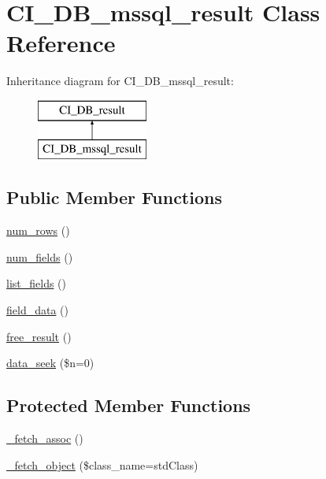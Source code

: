 \hypertarget{class_c_i___d_b__mssql__result}{}\section{C\+I\+\_\+\+D\+B\+\_\+mssql\+\_\+result Class Reference}
\label{class_c_i___d_b__mssql__result}
Inheritance diagram for C\+I\+\_\+\+D\+B\+\_\+mssql\+\_\+result\+:\begin{figure}[H]
\begin{center}
\leavevmode
\includegraphics[height=2.000000cm]{class_c_i___d_b__mssql__result}
\end{center}
\end{figure}
\subsection*{Public Member Functions}
\begin{DoxyCompactItemize}
\item 
\mbox{\hyperlink{class_c_i___d_b__mssql__result_a3ee369815a7eaba62882d23828b50169}{num\+\_\+rows}} ()
\item 
\mbox{\hyperlink{class_c_i___d_b__mssql__result_a419497c7541ba9324a4e7bcd1d0ececb}{num\+\_\+fields}} ()
\item 
\mbox{\hyperlink{class_c_i___d_b__mssql__result_a58e07860cb71e9ea572921ba205eb5ed}{list\+\_\+fields}} ()
\item 
\mbox{\hyperlink{class_c_i___d_b__mssql__result_af626a371016f12c8bcd9c896baa9930d}{field\+\_\+data}} ()
\item 
\mbox{\hyperlink{class_c_i___d_b__mssql__result_aaee2f39e9e8d98158bec83dd5a6405f9}{free\+\_\+result}} ()
\item 
\mbox{\hyperlink{class_c_i___d_b__mssql__result_ad6e178bd17e16d0a27489870aebe4900}{data\+\_\+seek}} (\$n=0)
\end{DoxyCompactItemize}
\subsection*{Protected Member Functions}
\begin{DoxyCompactItemize}
\item 
\mbox{\hyperlink{class_c_i___d_b__mssql__result_a53f012c686c033097e99ac6df383152b}{\+\_\+fetch\+\_\+assoc}} ()
\item 
\mbox{\hyperlink{class_c_i___d_b__mssql__result_a381f2bd9aac31eef9408a630f5ea48b1}{\+\_\+fetch\+\_\+object}} (\$class\+\_\+name=\textquotesingle{}std\+Class\textquotesingle{})
\end{DoxyCompactItemize}
